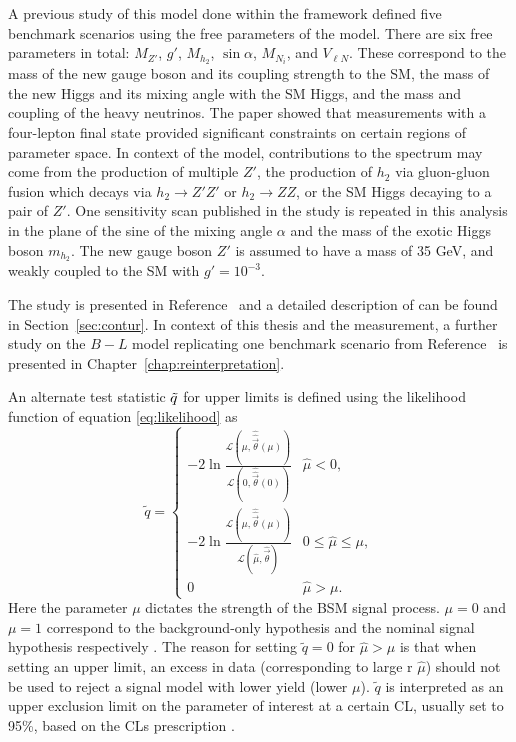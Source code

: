 A previous study of this model done within the \Contur framework defined five benchmark scenarios using the free parameters of the model. There are six free parameters in total: $M_{Z'}$, $g'$, $M_{h_2}$, $\sin \alpha$, $M_{N_i}$, and $V_{\ell N}$. These correspond to the mass of the new gauge boson and its coupling strength to the SM, the mass of the new Higgs and its mixing angle with the SM Higgs, and the mass  and coupling of the heavy neutrinos. The paper showed that \ATLAS measurements with a four-lepton final state provided significant constraints on certain regions of parameter space. In context of the model, contributions to the spectrum may come from the production of multiple $Z'$, the production of $h_2$ via gluon-gluon fusion which decays via $h_2\rightarrow Z'Z'$ or $h_2\rightarrow ZZ$, or the SM Higgs decaying to a pair of $Z'$. One sensitivity scan published in the study is repeated in this analysis in the plane of the sine of the mixing angle $\alpha$ and the mass of the exotic Higgs boson $m_{h_{\text{2}}}$. The new gauge boson $Z'$ is assumed to have a mass of 35 GeV, and weakly coupled to the SM with $g'=10^{-3}$. 

The study is presented in Reference~\cite{BLcontur} and a detailed description of \contur can be found in Section~\ref{sec:contur}. In context of this thesis and the \mFourL{} measurement, a further study on the $B-L$ model replicating one benchmark scenario from Reference~\cite{BLcontur} is presented in Chapter~\ref{chap:reinterpretation}.

An alternate test statistic $\Tilde{q}$ for upper limits is defined using the likelihood function of equation \ref{eq:likelihood} as
\begin{equation}
    \tilde{q} = 
    \begin{cases}
        - 2 \ln \frac{\mathcal{L}( {\mu}, \hat{\hat{\vec{\theta}}}({\mu})) } {\mathcal{L}(0,         \hat{\hat{\vec{\theta}}}(0) )} & \hat\mu < 0, \\ 
        - 2 \ln \frac{\mathcal{L}( {\mu}, \hat{\hat{\vec{\theta}}}({\mu})) } {\mathcal{L}(\hat{\mu}, \hat{\vec{\theta}} )} & 0 \leq \hat\mu \leq \mu,  \\ 
        0 & \hat\mu > \mu.
    \end{cases}
    \label{eq:lambda_qtilde}
\end{equation}
Here the parameter $\mu$ dictates the strength of the BSM signal process. $\mu = 0$ and $\mu = 1$ correspond to the background-only hypothesis and the nominal signal hypothesis respectively \cite{m4l2021_paper}. The reason for setting $\tilde{q} = 0$ for $\hat{\mu} > \mu$ is that when setting an upper limit, an excess in data (corresponding to large r $\hat{\mu}$) should not be used to reject a signal model with lower yield (lower $\mu$). $\tilde{q}$ is interpreted as an upper
exclusion limit on the parameter of interest at a certain CL, usually set to 95\%, based on the CLs prescription \cite{CLs_technique} . 


